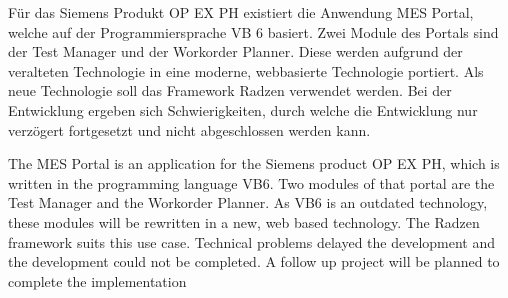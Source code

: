 \documentclass[
ngerman, %
a4paper, %
12pt,
pdftex,
disable %
]{report}
\newenvironment{abstractpage}
{\cleardoublepage\vspace*{\fill}\thispagestyle{empty}}
{\vfill\cleardoublepage}
\newenvironment{myabstract}[1]
{\bigskip\selectlanguage{#1}
\begin{center}
    \bfseries\abstractname
\end{center}}
{\par\bigskip}
\begin{document}
\begin{abstractpage}
  \begin{myabstract}{german}
    Für das Siemens Produkt \gls{OP EX PH} existiert die Anwendung MES Portal, welche auf der Programmiersprache \gls{VB} 6 basiert. Zwei Module des Portals sind der Test Manager und der Workorder Planner. Diese werden aufgrund der veralteten Technologie in eine moderne, webbasierte Technologie portiert. Als neue Technologie soll das Framework Radzen verwendet werden. Bei der Entwicklung ergeben sich Schwierigkeiten, durch welche die Entwicklung nur verzögert fortgesetzt und nicht abgeschlossen werden kann.
  \end{myabstract}

  \begin{myabstract}{english}
    The MES Portal is an application for the Siemens product \gls{OP EX PH}, which is written in the programming language \gls{VB}6. Two modules of that portal are the Test Manager and the Workorder Planner. As \gls{VB}6 is an outdated technology, these modules will be rewritten in a new, web based technology. The Radzen framework suits this use case. Technical problems delayed the development and the development could not be completed. A follow up project will be planned to complete the implementation
  \end{myabstract}
\end{abstractpage}

\tableofcontents
\listoftables
\listoffigures
\lstlistoflistings

\printnoidxglossary[type=main, title={Glossar}]
\printnoidxglossary[type=\acronymtype, title={Abkürzungsverzeichnis}]





\clearpage
\appendix
\clearpage

\cleardoublepage{}
\def\refname{Literaturverzeichnis}
\printbibliography

\newpage
\listoftodos
\end{document}
